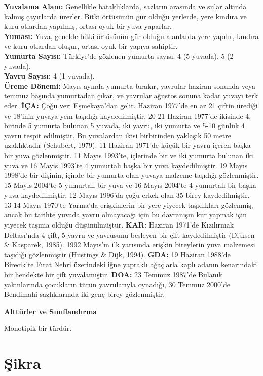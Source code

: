 \documentclass[
  a4paper,
  DIV=11,
  numbers=noendperiod]{scrreprt}
\begin{document}
\textbf{Yuvalama Alanı:} Genellikle bataklıklarda, sazların arasında ve
sular altında kalmış çayırlarda ürerler. Bitki örtüsünün gür olduğu
yerlerde, yere kındıra ve kuru otlardan yapılmış, ortası oyuk bir yuva
yaparlar.\\
\textbf{Yuması:} Yuva, genelde bitki örtüsünün gür olduğu alanlarda yere
yapılır, kındıra ve kuru otlardan oluşur, ortası oyuk bir yapıya
sahiptir.\\
\textbf{Yumurta Sayısı:} Türkiye'de gözlenen yumurta sayısı: 4 (5
yuvada), 5 (2 yuvada).\\
\textbf{Yavru Sayısı:} 4 (1 yuvada).\\
\textbf{Üreme Dönemi:} Mayıs ayında yumurta bırakır, yavrular haziran
sonunda veya temmuz başında yumurtadan çıkar, ve yavrular ağustos sonuna
kadar yuvayı terk eder. \textbf{İÇA:} Çoğu veri Eşmekaya'dan gelir.
Haziran 1977'de en az 21 çiftin ürediği ve 18'inin yuvaya yem taşıdığı
kaydedilmiştir. 20-21 Haziran 1977'de ikisinde 4, birinde 5 yumurta
bulunan 5 yuvada, iki yavru, iki yumurta ve 5-10 günlük 4 yavru tespit
edilmiştir. Bu yuvalardan ikisi birbirinden yaklaşık 50 metre
uzaklıktadır (Schubert, 1979). 11 Haziran 1971'de küçük bir yavru içeren
başka bir yuva gözlenmiştir. 11 Mayıs 1993'te, içlerinde bir ve iki
yumurta bulunan iki yuva ve 16 Mayıs 1993'te 4 yumurtalı başka bir yuva
kaydedilmiştir. 19 Mayıs 1998'de bir dişinin, içinde bir yumurta olan
yuvaya malzeme taşıdığı gözlenmiştir. 15 Mayıs 2004'te 5 yumurtalı bir
yuva ve 16 Mayıs 2004'te 4 yumurtalı bir başka yuva kaydedilmiştir. 12
Mayıs 1996'da çoğu erkek olan 35 birey kaydedilmiştir. 13-14 Mayıs
1970'te Yarma'da erişkinlerin bir yere yiyecek taşıdıkları gözlenmiş,
ancak bu tarihte yuvada yavru olmayacağı için bu davranışın kur yapmak
için yiyecek taşıma olduğu düşünülmüştür. \textbf{KAR:} Haziran 1971'de
Kızılırmak Deltası'nda 4 çift, 5 yavru ve yavrusunu besleyen bir çift
kaydedilmiştir (Dijksen \& Kasparek, 1985). 1992 Mayıs'ın ilk yarısında
erişkin bireylerin yuva malzemesi taşıdığı gözlenmiştir (Hustings \&
Dijk, 1994). \textbf{GDA:} 19 Haziran 1988'de Birecik'te Fırat Nehri
üzerindeki iğne yapraklı ağaçlarla kaplı adanın kenarındaki bir hendekte
bir çift yuvalamıştır. \textbf{DOA:} 23 Temmuz 1987'de Bulanık
yakınlarında çocukların türün yavrularıyla oynadığı, 30 Temmuz 2000'de
Bendimahi sazlıklarında iki genç birey gözlenmiştir.

\textbf{Alttürler ve Sınıflandırma}

Monotipik bir türdür.

\section{Şikra}\label{ux15fikra}
\end{document}
